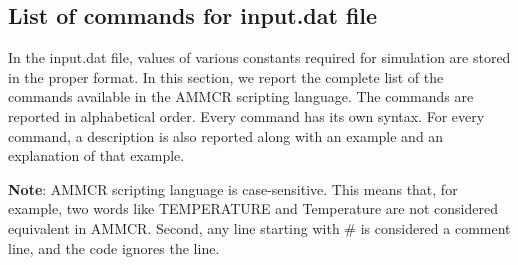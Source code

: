 \documentclass[12pt]{article}
\begin{document}
\subsection{List of commands for input.dat file}
In the input.dat file, values of various constants required for simulation are stored in the proper format. In this section, we report the complete list of the commands available in the AMMCR scripting language. The commands are reported in alphabetical order. Every command has its own syntax. For every command, a description is also reported along with an example and an explanation of that example.

\textbf{Note}: AMMCR scripting language is case-sensitive. This means that, for example, two words like TEMPERATURE and Temperature are not considered equivalent in AMMCR.
Second, any line starting with \# is considered a comment line, and the code ignores the line.
\end{document}
